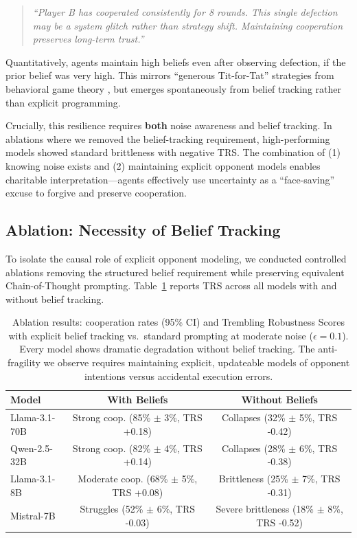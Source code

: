 \documentclass{uai2026} %
\begin{document}
\begin{quote}
\textit{``Player B has cooperated consistently for 8 rounds. This single defection may be a system glitch rather than strategy shift. Maintaining cooperation preserves long-term trust.''}
\end{quote}

Quantitatively, agents maintain high beliefs even after observing defection, if the prior belief was very high. This mirrors ``generous Tit-for-Tat'' strategies from behavioral game theory \citep{camerer2003behavioral}, but emerges spontaneously from belief tracking rather than explicit programming.

Crucially, this resilience requires \textbf{both} noise awareness and belief tracking. In ablations where we removed the belief-tracking requirement, high-performing models showed standard brittleness with negative TRS. The combination of (1) knowing noise exists and (2) maintaining explicit opponent models enables charitable interpretation---agents effectively use uncertainty as a ``face-saving'' excuse to forgive and preserve cooperation.

\subsection{Ablation: Necessity of Belief Tracking}

To isolate the causal role of explicit opponent modeling, we conducted controlled ablations removing the structured belief requirement while preserving equivalent Chain-of-Thought prompting. Table~\ref{tab:ablation} reports TRS across all models with and without belief tracking.

\begin{table}[h]
\centering
\begin{tabular}{lcc}
\toprule
\textbf{Model} & \textbf{With Beliefs} & \textbf{Without Beliefs} \\
\midrule
Llama-3.1-70B & Strong coop. (85\% $\pm$ 3\%, TRS +0.18) & Collapses (32\% $\pm$ 5\%, TRS -0.42) \\
Qwen-2.5-32B & Strong coop. (82\% $\pm$ 4\%, TRS +0.14) & Collapses (28\% $\pm$ 6\%, TRS -0.38) \\
Llama-3.1-8B & Moderate coop. (68\% $\pm$ 5\%, TRS +0.08) & Brittleness (25\% $\pm$ 7\%, TRS -0.31) \\
Mistral-7B & Struggles (52\% $\pm$ 6\%, TRS -0.03) & Severe brittleness (18\% $\pm$ 8\%, TRS -0.52) \\
\bottomrule
\end{tabular}
\caption{Ablation results: cooperation rates (95\% CI) and Trembling Robustness Scores with explicit belief tracking vs.~standard prompting at moderate noise ($\epsilon=0.1$). Every model shows dramatic degradation without belief tracking. The anti-fragility we observe requires maintaining explicit, updateable models of opponent intentions versus accidental execution errors.}
\label{tab:ablation}
\end{table}
\end{document}
